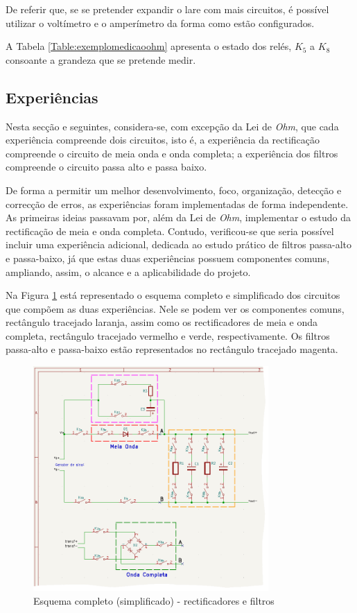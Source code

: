 De referir que, se se pretender expandir o \acrshort{lare} com mais circuitos, é possível utilizar o voltímetro e o amperímetro da forma como estão configurados. 

A Tabela \ref{Table:exemplomedicaoohm} apresenta o estado dos relés, $K_{5}$ a $K_{8}$ consoante a grandeza que se pretende medir.

\subsection{Experiências}
\label{sec:experiencias}
Nesta secção e seguintes, considera-se, com excepção da Lei de \textit{Ohm}, que cada experiência compreende dois circuitos, isto é, a experiência da rectificação compreende o circuito de meia onda e onda completa; a experiência dos filtros compreende o circuito passa alto e passa baixo.

De forma a permitir um melhor desenvolvimento, foco, organização, detecção e correcção de erros, as experiências foram implementadas de forma independente. As primeiras ideias passavam por, além da Lei de \textit{Ohm}, implementar o estudo da rectificação de meia e onda completa. Contudo, verificou-se que seria possível incluir uma experiência adicional, dedicada ao estudo prático de filtros passa-alto e passa-baixo, já que estas duas experiências possuem componentes comuns, ampliando, assim, o alcance e a aplicabilidade do projeto.

Na Figura \ref{fig:rectificacao_filtragem_full} está representado o esquema completo e simplificado dos circuitos que compõem as duas experiências. Nele se podem ver os componentes comuns, rectângulo tracejado laranja, assim como os rectificadores de meia e onda completa, rectângulo tracejado vermelho e verde, respectivamente. Os filtros passa-alto e passa-baixo estão representados no rectângulo tracejado magenta.

\begin{figure}[hbtp]
	\centering
	\includegraphics[width=0.8\textwidth]{figures/rec_fil_FULL.png}
	\caption{Esquema completo (simplificado) - rectificadores e filtros}
	\label{fig:rectificacao_filtragem_full}
\end{figure}

